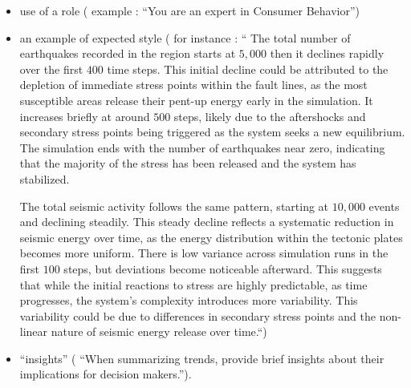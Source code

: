 \documentclass[preprint,12pt]{elsarticle}
\begin{document}
\begin{itemize}
    \item use of a role ( example : “You are an expert in Consumer Behavior”)
    \item an example of expected style ( for instance : “ The total number of earthquakes recorded in the region starts at $5,000$ then it declines rapidly over the first $400$ time steps. This initial decline could be attributed to the depletion of immediate stress points within the fault lines, as the most susceptible areas release their pent-up energy early in the simulation. It increases briefly at around $500$ steps, likely due to the aftershocks and secondary stress points being triggered as the system seeks a new equilibrium. The simulation ends with the number of earthquakes near zero, indicating that the majority of the stress has been released and the system has stabilized.

    The total seismic activity follows the same pattern, starting at $10,000$ events and declining steadily. This steady decline reflects a systematic reduction in seismic energy over time, as the energy distribution within the tectonic plates becomes more uniform. There is low variance across simulation runs in the first $100$ steps, but deviations become noticeable afterward. This suggests that while the initial reactions to stress are highly predictable, as time progresses, the system's complexity introduces more variability. This variability could be due to differences in secondary stress points and the non-linear nature of seismic energy release over time.“)
    \item “insights” ( “When summarizing trends, provide brief insights about their implications for decision makers.”).
\end{itemize}
\end{document}
